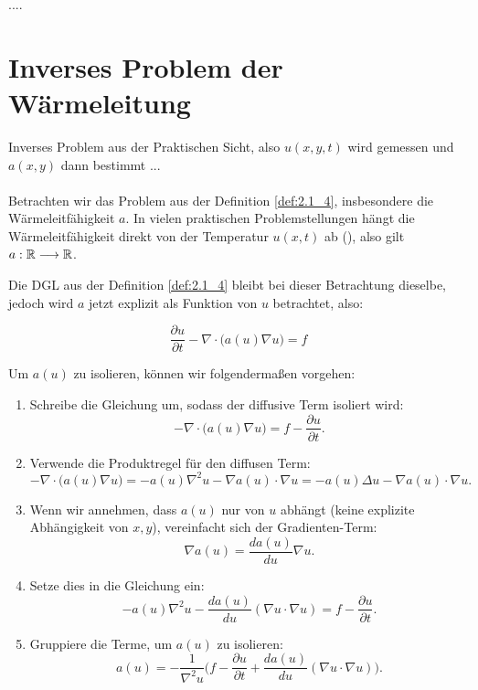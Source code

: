 ....



\section{Inverses Problem der Wärmeleitung}

{\color{red}Inverses Problem aus der Praktischen Sicht, also $u(x,y,t)$ wird gemessen und $a(x,y)$ dann bestimmt ...} \\\\


Betrachten wir das Problem aus der Definition \ref{def:2.1_4}, insbesondere die Wärmeleitfähigkeit $a$. In vielen praktischen Problemstellungen hängt die Wärmeleitfähigkeit direkt von der Temperatur $u(x,t)$ ab (\cite[S. 506]{Handrock-Meyer88}), also gilt $a:\mathbb{R} \longrightarrow \mathbb{R}$.

Die DGL aus der Definition \ref{def:2.1_4} bleibt bei dieser Betrachtung dieselbe, jedoch wird $a$ jetzt explizit als Funktion von $u$ betrachtet, also:

\begin{equation}
	\frac{\partial u}{\partial t} - \nabla \cdot \big(a(u) \nabla u\big) = f
	\label{equa:2.1_11}
\end{equation}

Um $a(u)$ zu isolieren, können wir folgendermaßen vorgehen:
\begin{enumerate}
	\item Schreibe die Gleichung um, sodass der diffusive Term isoliert wird:
	\[
	-\nabla \cdot \big(a(u) \nabla u\big) = f - \frac{\partial u}{\partial t}.
	\]
	
	\item Verwende die Produktregel für den diffusen Term:
	\[
	-\nabla \cdot \big(a(u) \nabla u\big) = -a(u) \nabla^2 u - \nabla a(u) \cdot \nabla u = -a(u) \Delta u - \nabla a(u) \cdot \nabla u.
	\]
	
	\item Wenn wir annehmen, dass $a(u)$ nur von $u$ abhängt (keine explizite Abhängigkeit von $x, y$), vereinfacht sich der Gradienten-Term:
	\[
	\nabla a(u) = \frac{da(u)}{du} \nabla u.
	\]
	
	\item Setze dies in die Gleichung ein:
	\[
	-a(u) \nabla^2 u - \frac{da(u)}{du} (\nabla u \cdot \nabla u) = f - \frac{\partial u}{\partial t}.
	\]
	
	\item Gruppiere die Terme, um $a(u)$ zu isolieren:
	\[
	a(u) = -\frac{1}{\nabla^2 u}\Big(f - \frac{\partial u}{\partial t} + \frac{da(u)}{du} (\nabla u \cdot \nabla u)\Big).
	\]
\end{enumerate}


